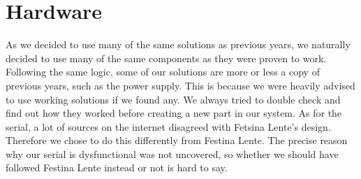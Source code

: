 \section {Hardware}

As we decided to use many of the same solutions as previous years, we naturally
decided to use many of the same components as they were proven to
work. Following the same logic, some of our solutions are more or less a copy of
previous years, such as the power supply. This is because we were heavily
advised to use working solutions if we found any. We always
tried to double check and find out how they worked before creating a new part in
our system. As for the serial, a lot of sources on the internet disagreed with
Fetsina Lente's design. Therefore we chose to do this differently from Festina Lente.
The precise reason why our serial is dysfunctional was not uncovered, so whether we
should have followed Festina Lente instead or not is hard to say.
